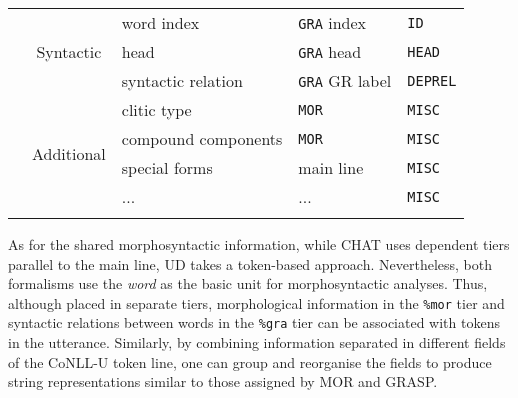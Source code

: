 \begin{table}[h!]
\begin{tabularx}{\widefigurewidth}{@{}lcXll@{}}
\multicolumn{1}{l}{\multirow{11}{*}{}}&\multicolumn{1}{c}{\multirow{3}{*}{Syntactic}}& word index      & \texttt{GRA} index& \texttt{ID}\\
\multicolumn{1}{l}{\multirow{11}{*}{}}&\multicolumn{1}{c}{\multirow{3}{*}{}}& head            & \texttt{GRA} head& \texttt{HEAD}\\
\multicolumn{1}{l}{\multirow{11}{*}{}}&\multicolumn{1}{c}{\multirow{3}{*}{}}& syntactic relation  & \texttt{GRA} GR label& \texttt{DEPREL}\\\addlinespace
\multicolumn{1}{l}{\multirow{11}{*}{}}&\multicolumn{1}{c}{\multirow{4}{*}{Additional}}& clitic type      & \texttt{MOR} & \texttt{MISC}\\
\multicolumn{1}{l}{\multirow{11}{*}{}}&\multicolumn{1}{c}{\multirow{4}{*}{}}& compound components  & \texttt{MOR} & \texttt{MISC}\\
\multicolumn{1}{l}{\multirow{11}{*}{}}&\multicolumn{1}{c}{\multirow{4}{*}{}}& special forms     & main line & \texttt{MISC}\\
\multicolumn{1}{l}{\multirow{11}{*}{}}&\multicolumn{1}{c}{\multirow{4}{*}{}}& ...              & ... & \texttt{MISC}\\\addlinespace
\bottomrule
\end{tabularx}
\end{table}

As for the shared morphosyntactic information, while CHAT uses dependent tiers parallel to the main line, UD takes a token-based approach. Nevertheless, both formalisms use the \emph{word} as the basic unit for morphosyntactic analyses. Thus, although placed in separate tiers, morphological information in the \texttt{\%mor} tier and syntactic relations between words in the \texttt{\%gra} tier can be associated with tokens in the utterance. Similarly, by combining information separated in different fields of the CoNLL-U token line, one can group and reorganise the fields to produce string representations similar to those assigned by MOR and GRASP.
